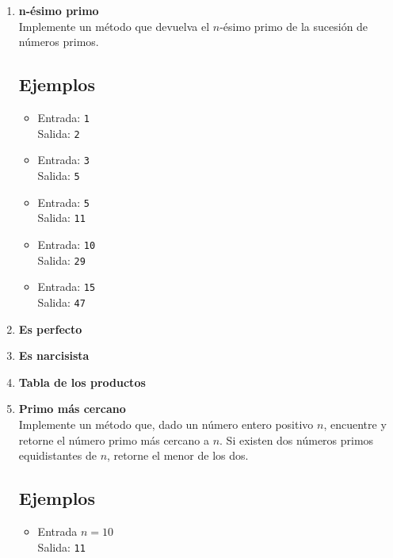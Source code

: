 \begin{enumerate}
    \item \textbf{n-ésimo primo}\\
    Implemente un método que devuelva el $n$-ésimo primo de la sucesión de números primos.
    \subsection*{Ejemplos}
    \begin{itemize} 
        \item Entrada: \texttt{1}\\ 
        Salida: \texttt{2}
        \item Entrada: \texttt{3}\\
        Salida: \texttt{5}
    
        \item Entrada: \texttt{5}\\
              Salida: \texttt{11}
        
        \item Entrada: \texttt{10}\\
              Salida: \texttt{29}
        
        \item Entrada: \texttt{15}\\
              Salida: \texttt{47}
    \end{itemize}
    
    \item \textbf{Es perfecto}\\
    

    \item \textbf{Es narcisista}\\
    

    \item \textbf{Tabla de los productos}
    

    \item \textbf{Primo más cercano}\\
    Implemente un método que, dado un número entero positivo \( n \), encuentre y retorne el número primo más cercano a \( n \). Si existen dos números primos equidistantes de \( n \), retorne el menor de los dos. 
    \subsection*{Ejemplos}
    \begin{itemize}
        \item Entrada \( n = 10 \)\\
        Salida: \texttt{11}
    

\end{itemize}
\end{enumerate}
